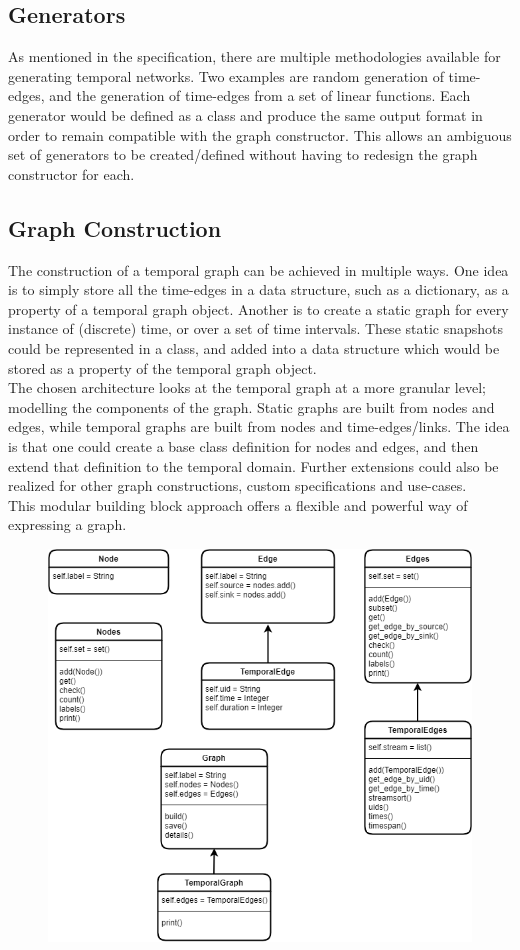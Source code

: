 \begin{design}
\subsection{Generators}
As mentioned in the specification, there are multiple methodologies available for generating temporal networks. Two examples are random generation of time-edges, and the generation of time-edges from a set of linear functions. Each generator would be defined as a class and produce the same output format  in order to remain compatible with the graph constructor. This allows an ambiguous set of generators to be created/defined without having to redesign the graph constructor for each.
\subsection{Graph Construction}
The construction of a temporal graph can be achieved in multiple ways. One idea is to simply store all the time-edges in a data structure, such as a dictionary, as a property of a temporal graph object. Another is to create a static graph for every instance of (discrete) time, or over a set of time intervals. These static snapshots could be represented in a class, and added into a data structure which would be stored as a property of the temporal graph object.\\
The chosen architecture looks at the temporal graph at a more granular level; modelling the components of the graph. Static graphs are built from nodes and edges, while temporal graphs are built from nodes and time-edges/links. The idea is that one could create a base class definition for nodes and edges, and then extend that definition to the temporal domain. Further extensions could also be realized for other graph constructions, custom specifications and use-cases.\\
This modular building block approach offers a flexible and powerful way of expressing a graph.
\begin{figure}[t]
    \centering
    \includegraphics[scale=0.7]{images/UML_graph_components.png}

\end{figure}
\end{design}
